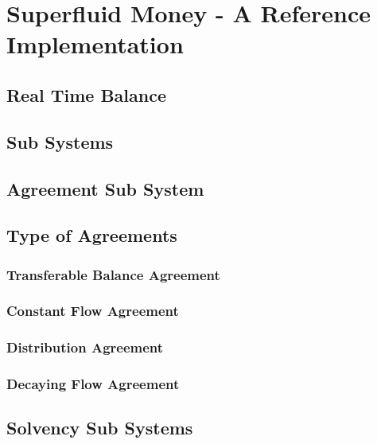 \chapter{Superfluid Money - A Reference Implementation}

\section{Real Time Balance}

\section{Sub Systems}

\section{Agreement Sub System}

\section{Type of Agreements}

\subsection{Transferable Balance Agreement}

\subsection{Constant Flow Agreement}

\subsection{Distribution Agreement}

\subsection{Decaying Flow Agreement}

\section{Solvency Sub Systems}

